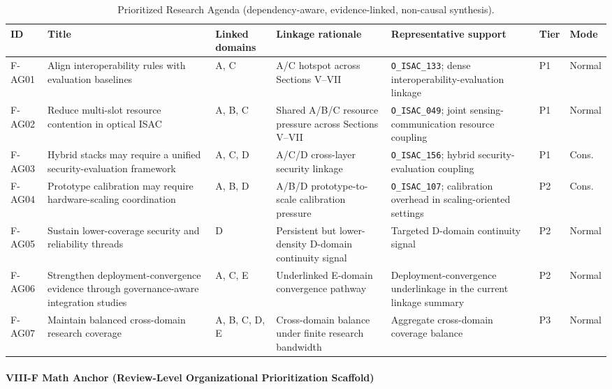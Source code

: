 \begin{table}[p]
\caption{Prioritized Research Agenda (dependency-aware, evidence-linked, non-causal synthesis).}
\label{tab:viii_f_2}
\centering
\setlength{\tabcolsep}{4pt}
\renewcommand{\arraystretch}{1.08}
\begin{tabularx}{\textwidth}{L{1.1cm} Y C{1.3cm} Y Y C{1.0cm} C{1.45cm}}
\toprule
ID & Title & Linked domains & Linkage rationale & Representative support & Tier & Mode \\
\midrule
F-AG01 & Align interoperability rules with evaluation baselines & A, C & A/C hotspot across Sections V--VII & \texttt{O\_ISAC\_133}; dense interoperability-evaluation linkage & P1 & Normal \\
F-AG02 & Reduce multi-slot resource contention in optical ISAC & A, B, C & Shared A/B/C resource pressure across Sections V--VII & \texttt{O\_ISAC\_049}; joint sensing-communication resource coupling & P1 & Normal \\
F-AG03 & Hybrid stacks may require a unified security-evaluation framework & A, C, D & A/C/D cross-layer security linkage & \texttt{O\_ISAC\_156}; hybrid security-evaluation coupling & P1 & Cons. \\
F-AG04 & Prototype calibration may require hardware-scaling coordination & A, B, D & A/B/D prototype-to-scale calibration pressure & \texttt{O\_ISAC\_107}; calibration overhead in scaling-oriented settings & P2 & Cons. \\
F-AG05 & Sustain lower-coverage security and reliability threads & D & Persistent but lower-density D-domain continuity signal & Targeted D-domain continuity signal & P2 & Normal \\
F-AG06 & Strengthen deployment-convergence evidence through governance-aware integration studies & A, C, E & Underlinked E-domain convergence pathway & Deployment-convergence underlinkage in the current linkage summary & P2 & Normal \\
F-AG07 & Maintain balanced cross-domain research coverage & A, B, C, D, E & Cross-domain balance under finite research bandwidth & Aggregate cross-domain coverage balance & P3 & Normal \\
\bottomrule
\end{tabularx}
\end{table}

\paragraph{VIII-F Math Anchor (Review-Level Organizational Prioritization Scaffold)}

